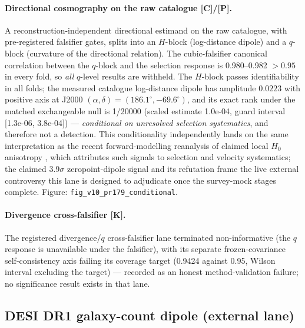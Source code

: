 \documentclass[10pt]{article}
\theoremstyle{definition}
\newcommand{\code}[1]{\texttt{\small #1}}
\newcommand{\tier}[1]{\textbf{[#1]}}
\begin{document}
\paragraph{Directional cosmography on the raw catalogue
\tier{C}/\tier{P}.}
A reconstruction-independent directional estimand on the raw
catalogue, with pre-registered falsifier gates, splits into an
$H$-block (log-distance dipole) and a $q$-block (curvature of the
directional relation). The cubic-falsifier canonical correlation
between the $q$-block and the selection response is
0.980--0.982 $> 0.95$ in every fold, so \emph{all} $q$-level
results are withheld. The $H$-block passes identifiability in all
folds; the measured catalogue log-distance dipole has amplitude
$0.0223$ with positive axis at J2000
$(\alpha, \delta) = (186.1^\circ, -69.6^\circ)$, and its exact rank
under the matched exchangeable null is
1/20000 (scaled estimate 1.0e-04, guard interval
[1.3e-06, 3.8e-04]) --- \emph{conditional on unresolved
selection systematics}, and therefore not a detection. This
conditionality independently lands on the same interpretation as the
recent forward-modelling reanalysis of claimed local $H_0$ anisotropy
\cite{NoH0Anisotropy2025}, which attributes such signals to
selection and velocity systematics; the claimed 3.9$\sigma$
zeropoint-dipole signal \cite{Boubel2025} and its refutation frame
the live external controversy this lane is designed to adjudicate
once the survey-mock stages complete.
Figure: \code{fig\_v10\_pr179\_conditional}.

\paragraph{Divergence cross-falsifier \tier{K}.}
The registered divergence/$q$ cross-falsifier lane terminated
non-informative (the $q$ response is unavailable under the falsifier),
with its separate frozen-covariance self-consistency axis failing its
coverage target (0.9424 against 0.95, Wilson interval excluding the
target) --- recorded as an honest method-validation failure; no
significance result exists in that lane.

\subsection{DESI DR1 galaxy-count dipole (external lane)}
\end{document}
